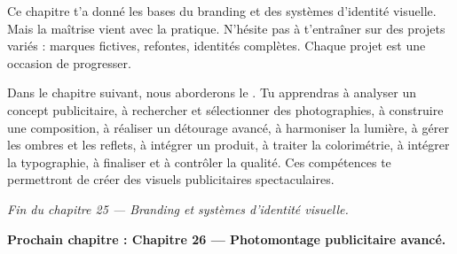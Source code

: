 Ce chapitre t'a donné les bases du branding et des systèmes d'identité visuelle. Mais la maîtrise vient avec la pratique. N'hésite pas à t'entraîner sur des projets variés : marques fictives, refontes, identités complètes. Chaque projet est une occasion de progresser.

Dans le chapitre suivant, nous aborderons le . Tu apprendras à analyser un concept publicitaire, à rechercher et sélectionner des photographies, à construire une composition, à réaliser un détourage avancé, à harmoniser la lumière, à gérer les ombres et les reflets, à intégrer un produit, à traiter la colorimétrie, à intégrer la typographie, à finaliser et à contrôler la qualité. Ces compétences te permettront de créer des visuels publicitaires spectaculaires.

\vspace{2em}

\begin{center}
\textit{Fin du chapitre 25 --- Branding et systèmes d'identité visuelle.}

\vspace{1em}

\textbf{Prochain chapitre : Chapitre 26 --- Photomontage publicitaire avancé.}
\end{center}